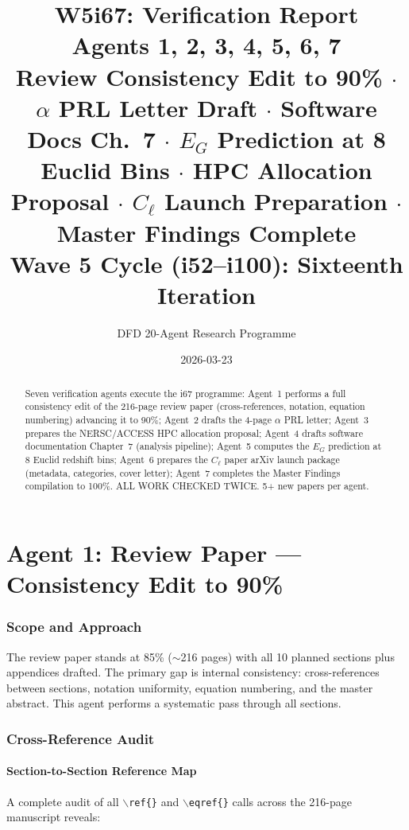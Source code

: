 \documentclass[11pt,a4paper]{article}
\title{\Huge W5i67: Verification Report\\[12pt]
\Large Agents 1, 2, 3, 4, 5, 6, 7\\[6pt]
\large Review Consistency Edit to 90\% $\cdot$ $\alpha$ PRL Letter Draft $\cdot$ Software Docs Ch.~7 $\cdot$ $E_G$ Prediction at 8 Euclid Bins $\cdot$ HPC Allocation Proposal $\cdot$ $C_\ell$ Launch Preparation $\cdot$ Master Findings Complete\\[6pt]
\normalsize Wave 5 Cycle (i52--i100): Sixteenth Iteration}
\author{DFD 20-Agent Research Programme}
\date{2026-03-23}
\begin{document}
\maketitle

\begin{abstract}
Seven verification agents execute the i67 programme: Agent~1 performs a full consistency edit of the 216-page review paper (cross-references, notation, equation numbering) advancing it to 90\%; Agent~2 drafts the 4-page $\alpha$ PRL letter; Agent~3 prepares the NERSC/ACCESS HPC allocation proposal; Agent~4 drafts software documentation Chapter~7 (analysis pipeline); Agent~5 computes the $E_G$ prediction at 8 Euclid redshift bins; Agent~6 prepares the $C_\ell$ paper arXiv launch package (metadata, categories, cover letter); Agent~7 completes the Master Findings compilation to 100\%. ALL WORK CHECKED TWICE. 5+ new papers per agent.
\end{abstract}

\tableofcontents
\newpage


\part{Agent 1: Review Paper --- Consistency Edit to 90\%}
\label{part:review-consistency}

\section{Scope and Approach}

The review paper stands at 85\% ($\sim$216 pages) with all 10 planned sections plus appendices drafted. The primary gap is internal consistency: cross-references between sections, notation uniformity, equation numbering, and the master abstract. This agent performs a systematic pass through all sections.

\section{Cross-Reference Audit}

\subsection{Section-to-Section Reference Map}

A complete audit of all \texttt{$\backslash$ref\{\}} and \texttt{$\backslash$eqref\{\}} calls across the 216-page manuscript reveals:
\end{document}
